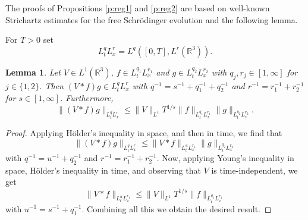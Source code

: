 \documentclass[11pt,a4paper]{scrartcl}
\newtheorem{lem}[thm]{Lemma}
\newcommand{\R}{\mathds{R}}
\begin{document}
The proofs of Propositions \ref{p:reg1} and \ref{p:reg2} are based on
well-known Strichartz estimates for the free Schr\"odinger evolution and the
following lemma.


For $T > 0$ set
\[
  L_t^q L_x^r = L^q([0,T], L^r(\R^3)).
\]


\begin{lem} \label{l:interp}
  Let $V \in L^1(\R^3)$, $f \in L_t^{q_1} L_x^{r_1}$ and $g \in L_t^{q_2}
  L_x^{r_2}$ with $q_j, r_j \in [1,\infty]$ for $j \in \{1,2\}$. Then $(V * f)
  g \in L_t^q L_x^r$ with $q^{-1} = s^{-1} + q_1^{-1} + q_2^{-1}$ and $r^{-1}
  = r_1^{-1} + r_2^{-1}$ for $s \in [1, \infty]$. Furthermore,
  \[
    \| (V * f)g \|_{L_t^q L_x^r} \le \| V \|_{L^1} T^{1/s} \| f \|_{L_t^{q_1}
    L_x^{r_1}} \| g \|_{L_t^{q_2} L_x^{r_2}}.
  \]
\end{lem}


\begin{proof}
  Applying H\"older's inequality in space, and then in time, we find that
  \[
    \| (V * f) g \|_{L_t^q L_x^r} \le \| V * f \|_{L_t^u L_x^{r_1}} \| g
    \|_{L_t^{q_2} L_x^{r_2}}
  \]
  with $q^{-1} = u^{-1} + q_2^{-1}$ and $r^{-1} = r_1^{-1} + r_2^{-1}$. Now,
  applying Young's inequality in space, H\"older's inequality in time, and
  observing that $V$ is time-independent, we get
  \[
    \| V * f \|_{L_t^u L_x^{r_1}} \le \| V \|_{L^1} T^{1/s} \| f \|_{L_t^{q_1}
    L_x^{r_1}}
  \]
  with $u^{-1} = s^{-1} + q_1^{-1}$. Combining all this we obtain the desired
  result.
\end{proof}
\end{document}
